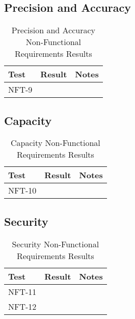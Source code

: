 \documentclass[12pt, titlepage]{article}
\begin{document}
\subsection{Precision and Accuracy}

\begin{table}[H]
\centering
    \setlength{\leftmargini}{0.4cm}
    \begin{tabular}{| >{\centering\arraybackslash}m{3cm} | 
      >{\centering\arraybackslash}m{4cm} | 
      >{\centering\arraybackslash}m{6cm} |}
    \hline
    \rowcolor[gray]{0.9}
    Test & Result & Notes\\
    \hline
    NFT-9 &  & \\
    \hline
    \end{tabular}
\caption{Precision and Accuracy Non-Functional Requirements Results}
\end{table}

\subsection{Capacity}

\begin{table}[H]
\centering
    \setlength{\leftmargini}{0.4cm}
    \begin{tabular}{| >{\centering\arraybackslash}m{3cm} | 
      >{\centering\arraybackslash}m{4cm} | 
      >{\centering\arraybackslash}m{6cm} |}
    \hline
    \rowcolor[gray]{0.9}
    Test & Result & Notes\\
    \hline
    NFT-10 &  & \\
    \hline
    \end{tabular}
\caption{Capacity Non-Functional Requirements Results}
\end{table}

\subsection{Security}

\begin{table}[H]
\centering
    \setlength{\leftmargini}{0.4cm}
    \begin{tabular}{| >{\centering\arraybackslash}m{3cm} | 
      >{\centering\arraybackslash}m{4cm} | 
      >{\centering\arraybackslash}m{6cm} |}
    \hline
    \rowcolor[gray]{0.9}
    Test & Result & Notes\\
    \hline
    NFT-11 &  & \\
    \hline
    NFT-12 &  & \\
    \hline
    \end{tabular}
\caption{Security Non-Functional Requirements Results}
\end{table}
\end{document}
